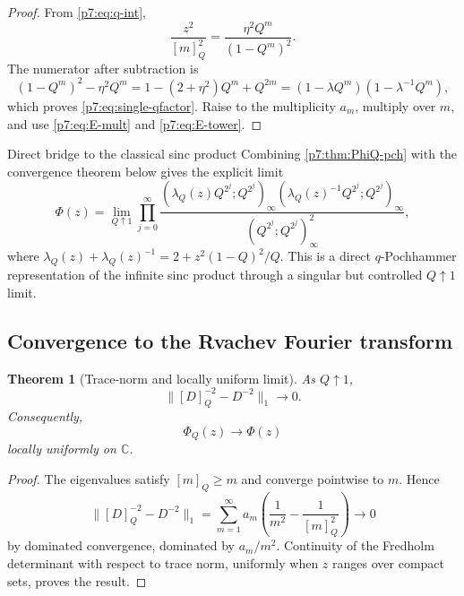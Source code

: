 \documentclass[11pt]{article}
\numberwithin{equation}{section}
\newtheorem{theorem}{Theorem}[section]
\theoremstyle{definition}
\theoremstyle{remark}
\newcommand{\C}{\mathbb C}
\begin{document}
\begin{proof}
From \cref{p7:eq:q-int},
\[
 \frac{z^2}{[m]_Q^2}
 =\frac{\eta^2Q^m}{(1-Q^m)^2}.
\]
The numerator after subtraction is
\[
 (1-Q^m)^2-\eta^2Q^m
 =1-(2+\eta^2)Q^m+Q^{2m}
 =(1-\lambda Q^m)(1-\lambda^{-1}Q^m),
\]
which proves \cref{p7:eq:single-qfactor}.  Raise to the multiplicity $a_m$, multiply over $m$, and use \cref{p7:eq:E-mult} and \cref{p7:eq:E-tower}.
\end{proof}

\begin{resultboxPartxx}{Direct bridge to the classical sinc product}
Combining \cref{p7:thm:PhiQ-pch} with the convergence theorem below gives the explicit limit
\[
 \Phi(z)=\lim_{Q\uparrow1}
 \prod_{j=0}^{\infty}
 \frac{(\lambda_Q(z)Q^{2^j};Q^{2^j})_\infty
       (\lambda_Q(z)^{-1}Q^{2^j};Q^{2^j})_\infty}
      {(Q^{2^j};Q^{2^j})_\infty^2},
\]
where $\lambda_Q(z)+\lambda_Q(z)^{-1}=2+z^2(1-Q)^2/Q$.  This is a direct $q$-Pochhammer representation of the infinite sinc product through a singular but controlled $Q\uparrow1$ limit.
\end{resultboxPartxx}

\subsection{Convergence to the Rvachev Fourier transform}

\begin{theorem}[Trace-norm and locally uniform limit]\label{p7:thm:PhiQ-limit}
As $Q\uparrow1$,
\begin{equation}\label{p7:eq:trace-norm-limit}
 \bigl\|[D]_Q^{-2}-D^{-2}\bigr\|_1\longrightarrow0.
\end{equation}
Consequently,
\begin{equation}\label{p7:eq:PhiQ-limit}
 \boxed{\ \Phi_Q(z)\longrightarrow\Phi(z)\ }
\end{equation}
locally uniformly on $\C$.
\end{theorem}

\begin{proof}
The eigenvalues satisfy $[m]_Q\ge m$ and converge pointwise to $m$.  Hence
\[
 \bigl\|[D]_Q^{-2}-D^{-2}\bigr\|_1
 =\sum_{m=1}^{\infty}a_m
 \left(\frac1{m^2}-\frac1{[m]_Q^2}\right)
 \longrightarrow0
\]
by dominated convergence, dominated by $a_m/m^2$.  Continuity of the Fredholm determinant with respect to trace norm, uniformly when $z$ ranges over compact sets, proves the result.
\end{proof}
\end{document}
